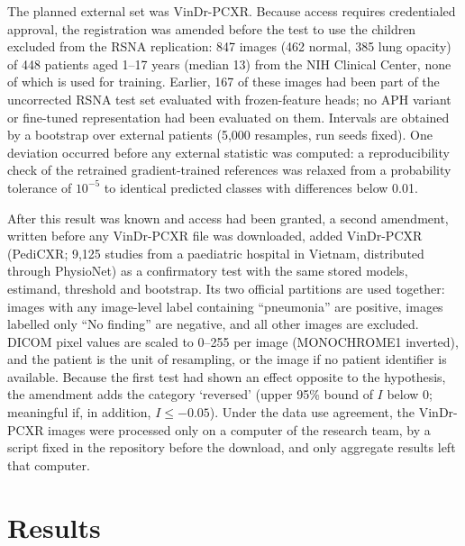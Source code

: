 \documentclass[10pt,letterpaper]{article}
\begin{document}
The planned external set was VinDr-PCXR. Because access requires credentialed approval, the registration was amended before the test to use the children excluded from the RSNA replication: 847 images (462 normal, 385 lung opacity) of 448 patients aged 1--17 years (median 13) from the NIH Clinical Center, none of which is used for training. Earlier, 167 of these images had been part of the uncorrected RSNA test set evaluated with frozen-feature heads; no APH variant or fine-tuned representation had been evaluated on them. Intervals are obtained by a bootstrap over external patients (5,000 resamples, run seeds fixed). One deviation occurred before any external statistic was computed: a reproducibility check of the retrained gradient-trained references was relaxed from a probability tolerance of $10^{-5}$ to identical predicted classes with differences below 0.01.

After this result was known and access had been granted, a second amendment, written before any VinDr-PCXR file was downloaded, added VinDr-PCXR (PediCXR; 9,125 studies from a paediatric hospital in Vietnam, distributed through PhysioNet) \citep{pham2023pedicxr,goldberger2000physionet} as a confirmatory test with the same stored models, estimand, threshold and bootstrap. Its two official partitions are used together: images with any image-level label containing ``pneumonia'' are positive, images labelled only ``No finding'' are negative, and all other images are excluded. DICOM pixel values are scaled to 0--255 per image (MONOCHROME1 inverted), and the patient is the unit of resampling, or the image if no patient identifier is available. Because the first test had shown an effect opposite to the hypothesis, the amendment adds the category `reversed' (upper 95\% bound of $I$ below 0; meaningful if, in addition, $I\le-0.05$). Under the data use agreement, the VinDr-PCXR images were processed only on a computer of the research team, by a script fixed in the repository before the download, and only aggregate results left that computer.

\section{Results}\label{sec:results}
\end{document}
